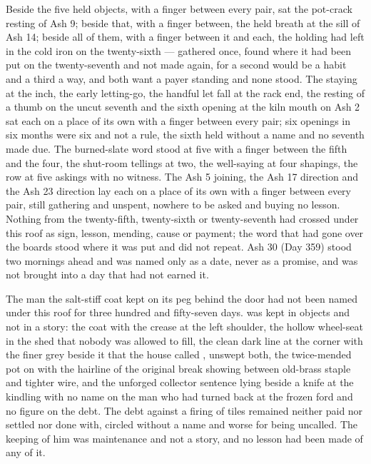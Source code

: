 Beside the five held objects, with a finger between every pair, sat the pot-crack resting of Ash 9; beside that, with a finger between, the held breath at the sill of Ash 14; beside all of them, with a finger between it and each, the holding  had left in the cold iron on the twenty-sixth --- gathered once, found where it had been put on the twenty-seventh and not made again, for a second would be a habit and a third a way, and both want a payer standing and none stood. The staying at the inch, the early letting-go, the handful let fall at the rack end, the resting of a thumb on the uncut seventh and the sixth opening at the kiln mouth on Ash 2 sat each on a place of its own with a finger between every pair; six openings in six months were six and not a rule, the sixth held without a name and no seventh made due. The burned-slate word stood at five with a finger between the fifth and the four, the shut-room tellings at two, the well-saying at four shapings, the row at five askings with no witness. The Ash 5 joining, the Ash 17 direction and the Ash 23 direction lay each on a place of its own with a finger between every pair, still gathering and unspent, nowhere to be asked and buying no lesson. Nothing from the twenty-fifth, twenty-sixth or twenty-seventh had crossed under this roof as sign, lesson, mending, cause or payment; the word that had gone over the boards stood where it was put and did not repeat. Ash 30 (Day 359) stood two mornings ahead and was named only as a date, never as a promise, and was not brought into a day that had not earned it.

The man the salt-stiff coat kept on its peg behind the door had not been named under this roof for three hundred and fifty-seven days.  was kept in objects and not in a story: the coat with the crease at the left shoulder, the hollow wheel-seat in the shed that nobody was allowed to fill, the clean dark line at the corner with the finer grey beside it that the house called , unswept both, the twice-mended pot on  with the hairline of the original break showing between old-brass staple and tighter wire, and the unforged collector sentence lying beside a knife at the kindling with no name on the man who had turned back at the frozen ford and no figure on the debt. The debt against a firing of tiles remained neither paid nor settled nor done with, circled without a name and worse for being uncalled. The keeping of him was maintenance and not a story, and no lesson had been made of any of it.

